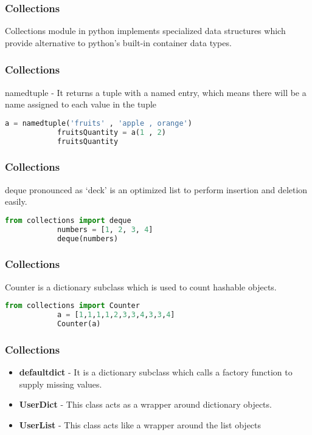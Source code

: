 \documentclass[14pt]{beamer}
\begin{document}
    \begin{frame}
        \frametitle{Collections}
        Collections module in python implements specialized data structures which provide alternative to python’s built-in container data types.
    \end{frame}
    \begin{frame}[containsverbatim]
        \frametitle{Collections}
        \alert{namedtuple} - It returns a tuple with a named entry, which means there will be a name assigned to each value in the tuple
        \begin{lstlisting}[language=Python]
            a = namedtuple('fruits' , 'apple , orange')
            fruitsQuantity = a(1 , 2)
            fruitsQuantity
        \end{lstlisting}
    \end{frame}
    \begin{frame}[containsverbatim]
        \frametitle{Collections}
        \alert{deque} pronounced as ‘deck’ is an optimized list to perform insertion and deletion easily.
        \begin{lstlisting}[language=Python]
            from collections import deque
            numbers = [1, 2, 3, 4]
            deque(numbers)
        \end{lstlisting}
    \end{frame}
    \begin{frame}[containsverbatim]
        \frametitle{Collections}
        \alert{Counter} is a dictionary subclass which is used to count hashable objects.
        \begin{lstlisting}[language=Python]
            from collections import Counter
            a = [1,1,1,1,2,3,3,4,3,3,4]
            Counter(a)
        \end{lstlisting}
    \end{frame}
    \begin{frame}
        \frametitle{Collections}
        \begin{itemize}
            \item \textbf{defaultdict} - It is a dictionary subclass which calls a factory function to supply missing values.
            \item \textbf{UserDict} - This class acts as a wrapper around dictionary objects. 
            \item \textbf{UserList} - This class acts like a wrapper around the list objects
        \end{itemize}
    \end{frame}
\end{document}

